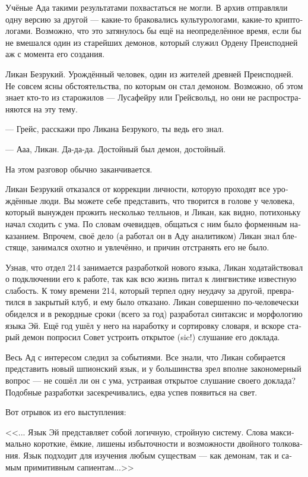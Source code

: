 \documentclass[a4paper,12pt,fleqn]{book}\usepackage{polyglossia}\setdefaultlanguage[babelshorthands=true]{russian}\setotherlanguage{english}\defaultfontfeatures{Ligatures=TeX,Mapping=tex-text}\usepackage{xcolor}\newcommand{\ml}[3]{#2}
\begin{document}
{Учёные Ада такими результатами похвастаться не могли.
В архив отправляли одну версию за другой --- какие-то браковались культурологами, какие-то криптологами.
Возможно, что это затянулось бы ещё на неопределённое время, если бы не вмешался один из старейших демонов, который служил Ордену Преисподней аж с момента его создания.

Ликан Безрукий.
Урождённый человек, один из жителей древней Преисподней.
Не совсем ясны обстоятельства, по которым он стал демоном.
Возможно, об этом знает кто-то из старожилов --- Лусафейру или Грейсвольд, но они не распространяются на эту тему.

--- Грейс, расскажи про Ликана Безрукого, ты ведь его знал.

--- Ааа, Ликан.
Да-да-да.
Достойный был демон, достойный.

На этом разговор обычно заканчивается.

Ликан Безрукий отказался от коррекции личности, которую проходят все урождённые люди.
Вы можете себе представить, что творится в голове у человека, который вынужден прожить несколько телльнов, и Ликан, как видно, потихоньку начал сходить с ума.
По словам очевидцев, общаться с ним было форменным наказанием.
Впрочем, своё дело (а работал он в Аду аналитиком) Ликан знал блестяще, занимался охотно и увлечённо, и причин отстранять его не было.

Узнав, что отдел 214 занимается разработкой нового языка, Ликан ходатайствовал о подключении его к работе, так как всю жизнь питал к лингвистике известную слабость.
К тому времени 214, который терпел одну неудачу за другой, превратился в закрытый клуб, и ему было отказано.
Ликан совершенно по-человечески обиделся и в рекордные сроки (всего за год) разработал синтаксис и морфологию языка Эй.
Ещё год ушёл у него на наработку и сортировку словаря, и вскоре старый демон попросил Совет устроить открытое (sic!) слушание его доклада.

Весь Ад с интересом следил за событиями.
Все знали, что Ликан собирается представить новый шпионский язык, и у большинства зрел вполне закономерный вопрос --- не сошёл ли он с ума, устраивая открытое слушание своего доклада?
Подобные разработки засекречивались, едва успев появиться на свет.

Вот отрывок из его выступления:

<<... Язык Эй представляет собой логичную, стройную систему.
Слова максимально короткие, ёмкие, лишены избыточности и возможности двойного толкования.
Язык подходит для изучения любым существам --- как демонам, так и самым примитивным сапиентам...>>

}
\end{document}
